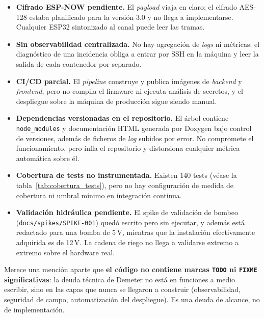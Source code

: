 \begin{itemize}[leftmargin=*]
    \item \textbf{Cifrado ESP-NOW pendiente.} El \textit{payload} viaja en
    claro; el cifrado AES-128 estaba planificado para la versi\'on 3.0 y no
    llega a implementarse. Cualquier ESP32 sintonizado al canal puede leer
    las tramas.
    \item \textbf{Sin observabilidad centralizada.} No hay agregaci\'on de
    \textit{logs} ni m\'etricas: el diagn\'ostico de una incidencia obliga a
    entrar por SSH en la m\'aquina y leer la salida de cada contenedor por
    separado.
    \item \textbf{CI/CD parcial.} El \textit{pipeline} construye y publica
    im\'agenes de \textit{backend} y \textit{frontend}, pero no compila el
    firmware ni ejecuta an\'alisis de secretos, y el despliegue sobre la
    m\'aquina de producci\'on sigue siendo manual.
    \item \textbf{Dependencias versionadas en el repositorio.} El \'arbol
    contiene \texttt{node\_modules} y documentaci\'on HTML generada por
    Doxygen bajo control de versiones, adem\'as de ficheros de \textit{log}
    subidos por error. No compromete el funcionamiento, pero infla el
    repositorio y distorsiona cualquier m\'etrica autom\'atica sobre \'el.
    \item \textbf{Cobertura de tests no instrumentada.} Existen 140 tests
    (v\'ease la tabla~\ref{tab:cobertura_tests}), pero no hay configuraci\'on
    de medida de cobertura ni umbral m\'inimo en integraci\'on continua.
    \item \textbf{Validaci\'on hidr\'aulica pendiente.} El spike de
    validaci\'on de bombeo (\texttt{docs/spikes/SPIKE-001}) qued\'o escrito
    pero sin ejecutar, y adem\'as est\'a redactado para una bomba de 5\,V,
    mientras que la instalaci\'on efectivamente adquirida es de 12\,V. La
    cadena de riego no llega a validarse extremo a extremo sobre el hardware
    real.
\end{itemize}

Merece una menci\'on aparte que \textbf{el c\'odigo no contiene marcas
\texttt{TODO} ni \texttt{FIXME} significativas}: la deuda t\'ecnica de
Demeter no est\'a en funciones a medio escribir, sino en las capas que
nunca se llegaron a construir (observabilidad, seguridad de campo,
automatizaci\'on del despliegue). Es una deuda de alcance, no de
implementaci\'on.
